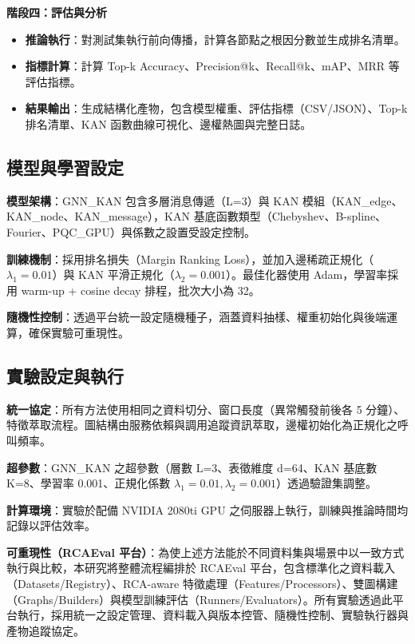 \documentclass[10pt,a4paper,twocolumn]{article}
\begin{document}
\textbf{階段四：評估與分析}
\begin{itemize}
\item \textbf{推論執行}：對測試集執行前向傳播，計算各節點之根因分數並生成排名清單。
\item \textbf{指標計算}：計算 Top-k Accuracy、Precision@k、Recall@k、mAP、MRR 等評估指標。
\item \textbf{結果輸出}：生成結構化產物，包含模型權重、評估指標（CSV/JSON）、Top-k 排名清單、KAN 函數曲線可視化、邊權熱圖與完整日誌。
\end{itemize}

\subsection{模型與學習設定}

\textbf{模型架構}：GNN\_KAN 包含多層消息傳遞（L=3）與 KAN 模組（KAN\_edge、KAN\_node、KAN\_message），KAN 基底函數類型（Chebyshev、B-spline、Fourier、PQC\_GPU）與係數之設置受設定控制。

\textbf{訓練機制}：採用排名損失（Margin Ranking Loss），並加入邊稀疏正規化（$\lambda_1=0.01$）與 KAN 平滑正規化（$\lambda_2=0.001$）。最佳化器使用 Adam，學習率採用 warm-up + cosine decay 排程，批次大小為 32。

\textbf{隨機性控制}：透過平台統一設定隨機種子，涵蓋資料抽樣、權重初始化與後端運算，確保實驗可重現性。

\subsection{實驗設定與執行}

\textbf{統一協定}：所有方法使用相同之資料切分、窗口長度（異常觸發前後各 5 分鐘）、特徵萃取流程。圖結構由服務依賴與調用追蹤資訊萃取，邊權初始化為正規化之呼叫頻率。

\textbf{超參數}：GNN\_KAN 之超參數（層數 L=3、表徵維度 d=64、KAN 基底數 K=8、學習率 0.001、正規化係數 $\lambda_1=0.01, \lambda_2=0.001$）透過驗證集調整。

\textbf{計算環境}：實驗於配備 NVIDIA 2080ti GPU 之伺服器上執行，訓練與推論時間均記錄以評估效率。

\textbf{可重現性（RCAEval 平台）}：為使上述方法能於不同資料集與場景中以一致方式執行與比較，本研究將整體流程編排於 RCAEval 平台，包含標準化之資料載入（Datasets/Registry）、RCA-aware 特徵處理（Features/Processors）、雙圖構建（Graphs/Builders）與模型訓練評估（Runners/Evaluators）。所有實驗透過此平台執行，採用統一之設定管理、資料載入與版本控管、隨機性控制、實驗執行器與產物追蹤協定。
\end{document}
